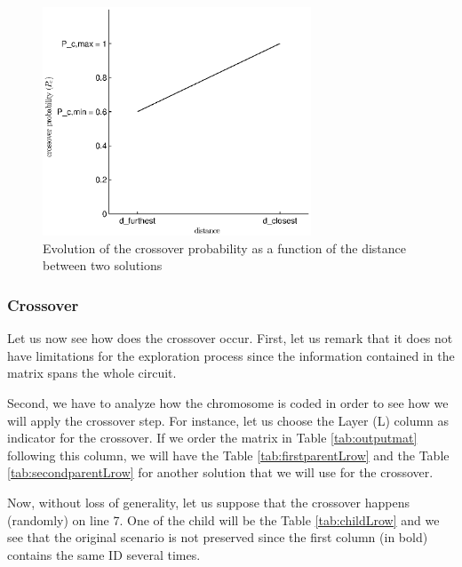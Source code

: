 \begin{figure}[h!]
\begin{center}
\includegraphics[width=8cm]{crossover_proba.eps}
\end{center}
\vspace{-0.5cm}
\caption{Evolution of the crossover probability as a function of the distance between two solutions}
\begin{center}
\end{center}
\label{fig:cross_proba}
\end{figure}

\subsubsection*{Crossover}

Let us now see how does the crossover occur. First, let us remark that it does not have limitations for the exploration process since the information contained in the matrix spans the whole circuit.

Second, we have to analyze how the chromosome is coded in order to see how we will apply the crossover step. For instance, let us choose the Layer (L) column as indicator for the crossover. If we order the matrix in Table \ref{tab:outputmat} following this column, we will have the Table \ref{tab:firstparentLrow} and the Table \ref{tab:secondparentLrow} for another solution that we will use for the crossover.

Now, without loss of generality, let us suppose that the crossover happens (randomly) on line 7. One of the child will be the Table \ref{tab:childLrow} and we see that the original scenario is not preserved since the first column (in bold) contains the same ID several times.

